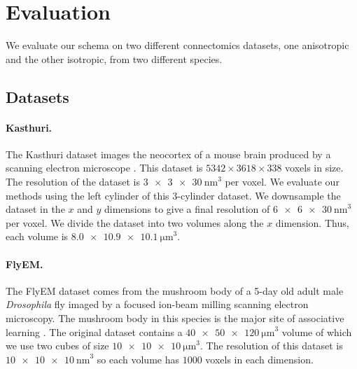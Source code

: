 \section{Evaluation}

We evaluate our schema on two different connectomics datasets, one anisotropic and the other isotropic, from two different species. 

\subsection{Datasets}
\label{sec:dataset}
\paragraph{Kasthuri.}
The Kasthuri dataset images the neocortex of a mouse brain produced by a scanning electron microscope \cite{kasthuri2015saturated}. 
This dataset is $5342 \times 3618 \times 338$ voxels in size. 
The resolution of the dataset is $\SI[product-units=single]{3 x 3 x 30}{\nano\meter}^3$ per voxel. 
We evaluate our methods using the left cylinder of this 3-cylinder dataset. 
We downsample the dataset in the $x$ and $y$ dimensions to give a final resolution of $\SI[product-units=single]{6 x 6 x 30}{\nano\meter}^3$ per voxel. 
We divide the dataset into two volumes along the $x$ dimension.
Thus, each volume is $\SI[product-units=single]{8.0 x 10.9 x 10.1}{\micro\meter}^3$. 

\paragraph{FlyEM.}
The FlyEM dataset comes from the mushroom body of a 5-day old adult male \textit{Drosophila} fly imaged by a focused ion-beam milling scanning electron microscopy.  
The mushroom body in this species is the major site of associative learning \cite{takemura2017connectome}. 
The original dataset contains a $\SI[product-units=single]{40 x 50 x 120}{\micro\meter}^3$ volume of which we use two cubes of size $\SI[product-units=single]{10 x 10 x 10}{\micro\meter}^3$. 
The resolution of this dataset is $\SI[product-units=single]{10 x 10 x 10}{\nano\meter}^3$ so each volume has $1000$ voxels in each dimension.

